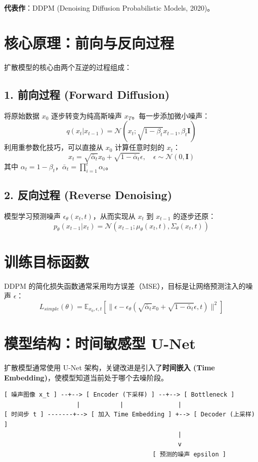 \documentclass[12pt, a4paper]{book}
\begin{document}
\textbf{代表作}：DDPM (Denoising Diffusion Probabilistic Models, 2020)。

\section{核心原理：前向与反向过程}
扩散模型的核心由两个互逆的过程组成：

\subsection{1. 前向过程 (Forward Diffusion)}
将原始数据 $x_0$ 逐步转变为纯高斯噪声 $x_T$。每一步添加微小噪声：
$$ q(x_t | x_{t-1}) = \mathcal{N}(x_t; \sqrt{1 - \beta_t} x_{t-1}, \beta_t \mathbf{I}) $$
利用重参数化技巧，可以直接从 $x_0$ 计算任意时刻的 $x_t$：
$$ x_t = \sqrt{\bar{\alpha}_t} x_0 + \sqrt{1 - \bar{\alpha}_t} \epsilon, \quad \epsilon \sim \mathcal{N}(0, \mathbf{I}) $$
其中 $\alpha_t = 1 - \beta_t$，$\bar{\alpha}_t = \prod_{i=1}^t \alpha_i$。

\subsection{2. 反向过程 (Reverse Denoising)}
模型学习预测噪声 $\epsilon_\theta(x_t, t)$，从而实现从 $x_t$ 到 $x_{t-1}$ 的逐步还原：
$$ p_\theta(x_{t-1} | x_t) = \mathcal{N}(x_{t-1}; \mu_\theta(x_t, t), \Sigma_\theta(x_t, t)) $$

\section{训练目标函数}
DDPM 的简化损失函数通常采用均方误差（MSE），目标是让网络预测注入的噪声 $\epsilon$：
$$ L_{simple}(\theta) = \mathbb{E}_{x_0, \epsilon, t} \left[ \| \epsilon - \epsilon_\theta(\sqrt{\bar{\alpha}_t} x_0 + \sqrt{1 - \bar{\alpha}_t} \epsilon, t) \|^2 \right] $$

\section{模型结构：时间敏感型 U-Net}
扩散模型通常使用 U-Net 架构，关键改进是引入了\textbf{时间嵌入 (Time Embedding)}，使模型知道当前处于哪个去噪阶段。
\begin{verbatim}
[ 噪声图像 x_t ] --+--> [ Encoder (下采样) ] --+--> [ Bottleneck ]
                    |           |               |
[ 时间步 t ] -------+--> [ 加入 Time Embedding ] +--> [ Decoder (上采样) ]
                                                |
                                                v
                                         [ 预测的噪声 epsilon ]
\end{verbatim}
\end{document}
